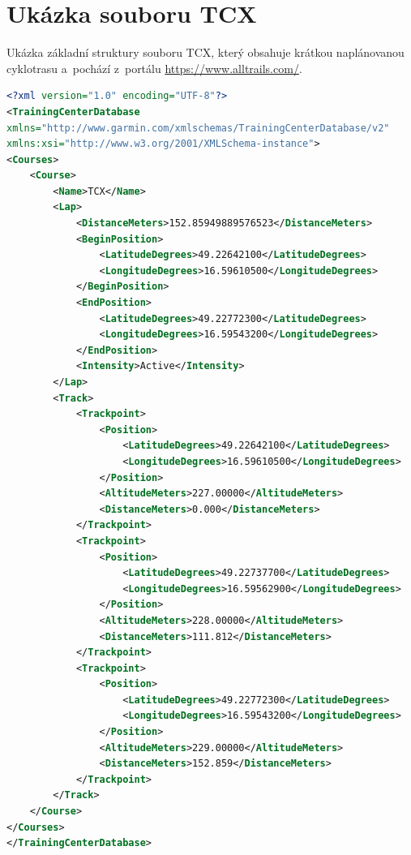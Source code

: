 
\chapter{Ukázka souboru TCX}
\label{TheTCXFileSample}

Ukázka základní struktury souboru TCX, který obsahuje krátkou naplánovanou cyklotrasu a~pochází z~portálu \url{https://www.alltrails.com/}.

\begin{lstlisting}[aboveskip=2em, caption={Formát souboru TCX.\protect\footnotemark}, frame=lines, label=TCXProtocol, language=XML]
<?xml version="1.0" encoding="UTF-8"?>
<TrainingCenterDatabase
xmlns="http://www.garmin.com/xmlschemas/TrainingCenterDatabase/v2"
xmlns:xsi="http://www.w3.org/2001/XMLSchema-instance">
<Courses>
    <Course>
        <Name>TCX</Name>
        <Lap>
            <DistanceMeters>152.85949889576523</DistanceMeters>
            <BeginPosition>
                <LatitudeDegrees>49.22642100</LatitudeDegrees>
                <LongitudeDegrees>16.59610500</LongitudeDegrees>
            </BeginPosition>
            <EndPosition>
                <LatitudeDegrees>49.22772300</LatitudeDegrees>
                <LongitudeDegrees>16.59543200</LongitudeDegrees>
            </EndPosition>
            <Intensity>Active</Intensity>
        </Lap>
        <Track>
            <Trackpoint>
                <Position>
                    <LatitudeDegrees>49.22642100</LatitudeDegrees>
                    <LongitudeDegrees>16.59610500</LongitudeDegrees>
                </Position>
                <AltitudeMeters>227.00000</AltitudeMeters>
                <DistanceMeters>0.000</DistanceMeters>
            </Trackpoint>
            <Trackpoint>
                <Position>
                    <LatitudeDegrees>49.22737700</LatitudeDegrees>
                    <LongitudeDegrees>16.59562900</LongitudeDegrees>
                </Position>
                <AltitudeMeters>228.00000</AltitudeMeters>
                <DistanceMeters>111.812</DistanceMeters>
            </Trackpoint>
            <Trackpoint>
                <Position>
                    <LatitudeDegrees>49.22772300</LatitudeDegrees>
                    <LongitudeDegrees>16.59543200</LongitudeDegrees>
                </Position>
                <AltitudeMeters>229.00000</AltitudeMeters>
                <DistanceMeters>152.859</DistanceMeters>
            </Trackpoint>
        </Track>
    </Course>
</Courses>
</TrainingCenterDatabase>
\end{lstlisting}

